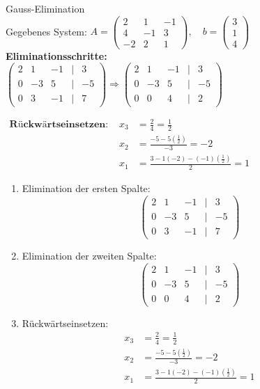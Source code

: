 \begin{example2}{Gauss-Elimination}
\vspace{-3mm}\\
Gegebenes System:
$A = \begin{pmatrix}
2 & 1 & -1\\
4 & -1 & 3\\
-2 & 2 & 1
\end{pmatrix}, \quad b = \begin{pmatrix}
3\\
1\\
4
\end{pmatrix}$
\vspace{2mm}\\
\textbf{  Eliminationsschritte: }
\vspace{2mm}\\
$\begin{pmatrix}
    2 & 1 & -1 & | & 3\\
    0 & -3 & 5 & | & -5\\
    0 & 3 & -1 & | & 7
    \end{pmatrix}
    \Rightarrow
    \begin{pmatrix}
    2 & 1 & -1 & | & 3\\
    0 & -3 & 5 & | & -5\\
    0 & 0 & 4 & | & 2
    \end{pmatrix}$

    \raggedright
$
\begin{array}{lrl}
    \textbf{Rückwärtseinsetzen: }& x_3 &= \frac{2}{4} = \frac{1}{2}\\
    &x_2 &= \frac{-5 - 5(\frac{1}{2})}{-3} = -2\\
    &x_1 &= \frac{3 - 1(-2) - (-1)(\frac{1}{2})}{2} = 1
\end{array}
$



\begin{enumerate}
    \item Elimination der ersten Spalte:
    $$\begin{pmatrix}
    2 & 1 & -1 & | & 3\\
    0 & -3 & 5 & | & -5\\
    0 & 3 & -1 & | & 7
    \end{pmatrix}$$
    
    \item Elimination der zweiten Spalte:
    $$\begin{pmatrix}
    2 & 1 & -1 & | & 3\\
    0 & -3 & 5 & | & -5\\
    0 & 0 & 4 & | & 2
    \end{pmatrix}$$
    
    \item Rückwärtseinsetzen:
    \begin{align*}
        x_3 &= \frac{2}{4} = \frac{1}{2}\\
        x_2 &= \frac{-5 - 5(\frac{1}{2})}{-3} = -2\\
        x_1 &= \frac{3 - 1(-2) - (-1)(\frac{1}{2})}{2} = 1
    \end{align*}
\end{enumerate}
\end{example2}

